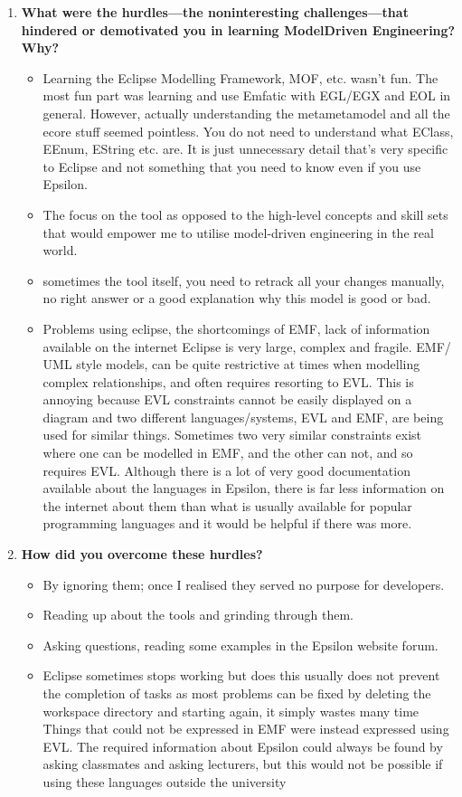 \documentclass[12pt, a4paper]{report}
\begin{document}
{\begin{appendices}
\begin{enumerate}
\item \textbf{ What were the hurdles---the non­interesting challenges---that hindered or demotivated you in learning Model­Driven Engineering? Why?}
\begin{itemize}
\item Learning the Eclipse Modelling Framework, MOF, etc. wasn't fun. The most fun part was learning and use Emfatic with EGL/EGX and EOL in general. However, actually understanding the meta­metamodel and all the ecore stuff seemed pointless. You do not need to understand what EClass, EEnum, EString etc. are. It is just unnecessary detail that's very specific to
Eclipse and not something that you need to know even if you use Epsilon.
\item The focus on the tool as opposed to the high-level concepts and skill sets that would empower me to utilise model-driven engineering in the real world.
\item sometimes the tool itself, you need to re­track all your changes manually, no right answer or a good explanation why this model is good or bad.
\item Problems using eclipse, the shortcomings of EMF, lack of information available on the internet Eclipse is very large, complex and fragile. EMF/ UML ­style models, can be quite restrictive at times when modelling complex relationships, and often requires resorting to EVL. This is annoying because EVL constraints cannot be easily displayed on a diagram and two different languages/systems, EVL and EMF, are being used for similar things. Sometimes two very similar constraints exist where one can be modelled in EMF, and the other can not, and so requires EVL. Although there is a lot of very good documentation available about the languages in Epsilon, there is far less information on the internet about them than what is usually available for popular programming languages and it would be helpful if there was more.
\end{itemize}

\item \textbf{How did you overcome these hurdles?}
\begin{itemize}
\item By ignoring them; once I realised they served no purpose for developers.
\item Reading up about the tools and grinding through them.
\item Asking questions, reading some examples in the Epsilon website forum.
\item Eclipse sometimes stops working but does this usually does not prevent the completion of tasks as most problems can be fixed by deleting the workspace directory and starting again, it simply wastes many time Things that could not be expressed in EMF were instead expressed using EVL. The required information about Epsilon could always be found by
asking classmates and asking lecturers, but this would not be possible if using these languages outside the university
\end{itemize}
\end{enumerate}


\end{appendices}}
\end{document}
